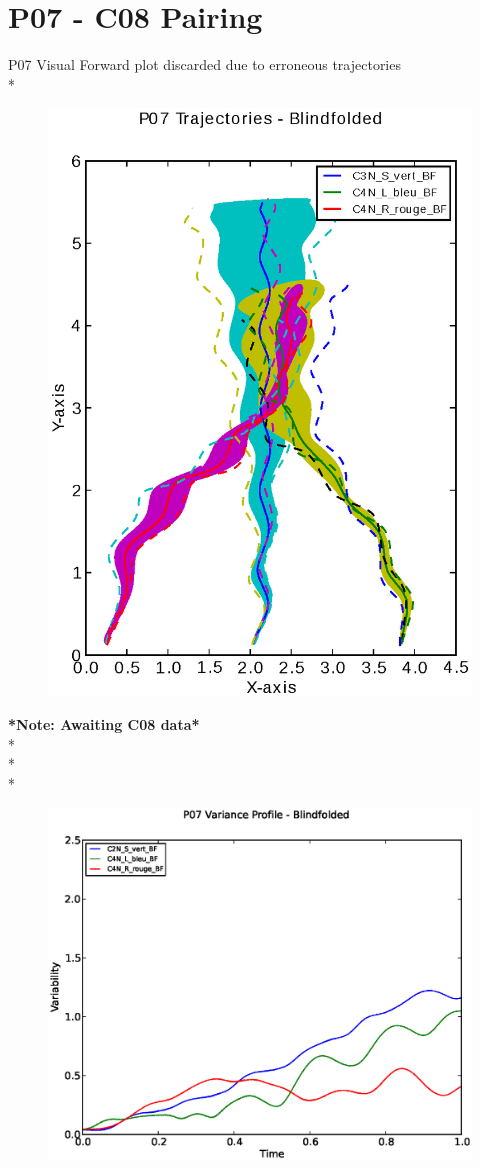 \documentclass[a4page,landscape,twocolumn,10pt]{article}
\begin{document}
\section{P07 - C08 Pairing}
P07 Visual Forward plot discarded due to erroneous trajectories
\\*
\begin{figure}[!htbp]
  \centering
  \includegraphics[width=0.4\linewidth]{P07_trajectory_BF.eps}
\end{figure}

\newpage
\textbf{*Note: Awaiting C08 data*}
\\*
\\*
\\*
\begin{figure}[!htbp]
  \centering
  \includegraphics[width=0.45\linewidth]{P07_Variability_profile_BF.eps}

\end{figure}

\clearpage
\end{document}
